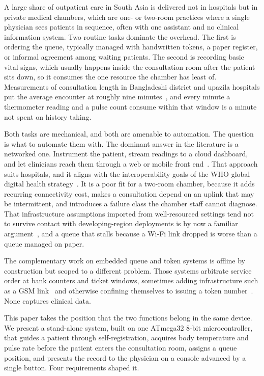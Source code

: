 A large share of outpatient care in South Asia is delivered not in hospitals but in private
medical chambers, which are one- or two-room practices where a single physician sees patients
in sequence, often with one assistant and no clinical information system. Two routine tasks
dominate the overhead. The first is ordering the queue, typically managed with handwritten
tokens, a paper register, or informal agreement among waiting patients. The second is
recording basic vital signs, which usually happens inside the consultation room after the
patient sits down, so it consumes the one resource the chamber has least of. Measurements of
consultation length in Bangladeshi district and upazila hospitals put the average encounter
at roughly nine minutes~\cite{das2021appointment}, and every minute a thermometer reading and
a pulse count consume within that window is a minute not spent on history taking.

Both tasks are mechanical, and both are amenable to automation. The question is what to automate them
with. The dominant answer in the literature is a networked one. Instrument the patient, stream
readings to a cloud dashboard, and let clinicians reach them through a web or mobile front
end~\cite{irjet2020,rath2021,hrtemp2019}. That approach suits hospitals, and it aligns with the
interoperability goals of the WHO global digital health strategy~\cite{who2021digital}. It is a poor
fit for a two-room chamber, because it adds recurring connectivity cost, makes a consultation depend
on an uplink that may be intermittent, and introduces a failure class the chamber staff cannot
diagnose. That infrastructure assumptions imported from well-resourced settings tend not to survive
contact with developing-region deployments is by now a familiar argument~\cite{brewer2005case}, and a
queue that stalls because a Wi-Fi link dropped is worse than a queue managed on paper.

The complementary work on embedded queue and token systems is offline by construction but scoped to a
different problem. Those systems arbitrate service order at bank counters and ticket windows,
sometimes adding infrastructure such as a GSM link~\cite{qgsm2013} and otherwise confining themselves
to issuing a token number~\cite{eqc2022,arpn2019}. None captures clinical data.

This paper takes the position that the two functions belong in the same device. We present a
stand-alone system, built on one ATmega32 8-bit microcontroller, that guides a patient through
self-registration, acquires body temperature and pulse rate before the patient enters the
consultation room, assigns a queue position, and presents the record to the physician on a
console advanced by a single button. Four requirements shaped it.

